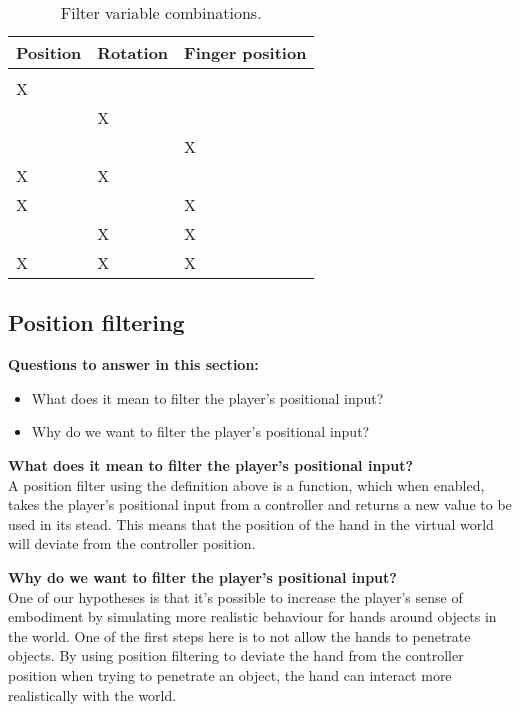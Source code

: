 \begin{table}[H]
\centering
\caption{Filter variable combinations.}
\label{tab:filterVariableCombinations}
\begin{tabular}{C{2cm}C{2cm}C{2cm}}
Position & Rotation & Finger position \\ \midrule \midrule
				&					&					\\ \midrule
\Large X	&					&					\\ \midrule
				& \Large X	& 		                \\ \midrule
				&					& \Large X     \\ \midrule
\Large X	& \Large X	&					\\ \midrule
\Large X 	&					& \Large X	\\ \midrule
				& \Large X	& \Large X	\\ \midrule
\Large X 	& \Large X 	& \Large X
\end{tabular}
\end{table}

\subsection{Position filtering}
\label{subsec:categoryPositionFiltering}
\textbf{Questions to answer in this section:}
\begin{itemize}
\setlength\itemsep{-0.1cm}
\item What does it mean to filter the player's positional input?
\item Why do we want to filter the player's positional input?
\end{itemize}

\textbf{What does it mean to filter the player's positional input?}\\
A position filter using the definition above is a function, which when enabled, takes the player's positional input from a controller and returns a new value to be used in its stead. This means that the position of the hand in the virtual world will deviate from the controller position.

\textbf{Why do we want to filter the player's positional input?}\\
One of our hypotheses is that it's possible to increase the player's sense of embodiment by simulating more realistic behaviour for hands around objects in the world. One of the first steps here is to not allow the hands to penetrate objects. By using position filtering to deviate the hand from the controller position when trying to penetrate an object, the hand can interact more realistically with the world.

